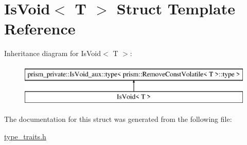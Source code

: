 \hypertarget{struct_is_void}{}\section{Is\+Void$<$ T $>$ Struct Template Reference}
\label{struct_is_void}
Inheritance diagram for Is\+Void$<$ T $>$\+:\begin{figure}[H]
\begin{center}
\leavevmode
\includegraphics[height=2.000000cm]{struct_is_void}
\end{center}
\end{figure}


The documentation for this struct was generated from the following file\+:\begin{DoxyCompactItemize}
\item 
\hyperlink{type__traits_8h}{type\+\_\+traits.\+h}\end{DoxyCompactItemize}
